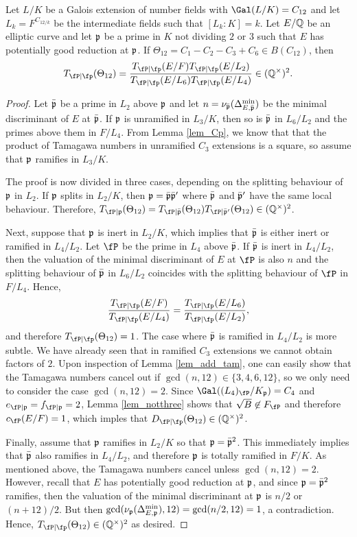 \begin{lemma}
    Let $L/K$ be a Galois extension of number fields with $\Gal(L/K)=C_{12}$ and let $L_k=F^{C_{12/k}}$ be the intermediate fields such that $[L_k:K]=k$. Let $E/\mathbb{Q}$ be an elliptic curve and let $\mathfrak{p}$ be a prime in $K$ not dividing $2$ or $3$ such that $E$ has potentially good reduction at $\mathfrak{p}$. If $\Theta_{12}=C_1-C_2-C_3+C_6\in B(C_{12})$, then $$\Tp(\Theta_{12})=\frac{\Tp(E/F)\Tp(E/L_2)}{\Tp(E/L_6)\Tp(E/L_4)}\in\QQss.$$
\end{lemma}
\begin{proof}
    Let $\bar{\mathfrak{p}}$ be a prime in $L_2$ above $\mathfrak{p}$ and let $n=\nu_{\bar{\mathfrak{p}}}(\Delta_{E,\bar{\mathfrak{p}}}^{\min})$ be the minimal discriminant of $E$ at $\bar{\mathfrak{p}}$. If $\mathfrak{p}$ is unramified in $L_3/K$, then so is $\bar{\mathfrak{p}}$ in $L_6/L_2$ and the primes above them in $F/L_4$. From Lemma \ref{lem_Cp}, we know that that the product of Tamagawa numbers in unramified $C_3$ extensions is a square, so assume that $\mathfrak{p}$ ramifies in $L_3/K$.

    The proof is now divided in three cases, depending on the splitting behaviour of $\mathfrak{p}$ in $L_2$. If $\mathfrak{p}$ splits in $L_2/K$, then $\mathfrak{p}=\bar{\mathfrak{p}}\bar{\mathfrak{p}}'$ where $\bar{\mathfrak{p}}$ and $\bar{\mathfrak{p}}'$ have the same local behaviour. Therefore, $T_{\fP\mid\pp}(\Theta_{12})=T_{\fP\mid\bar\pp}(\Theta_{12})T_{\fP\mid\bar\pp'}(\Theta_{12})\in\QQss$. 
    
    Next, suppose that $\mathfrak{p}$ is inert in $L_2/K$, which implies that $\bar{\mathfrak{p}}$ is either inert or ramified in $L_4/L_2$. Let $\fP$ be the prime in $L_4$ above $\bar{\mathfrak{p}}$. If $\bar{\mathfrak{p}}$ is inert in $L_4/L_2$, then the valuation of the minimal discriminant of $E$ at $\fP$ is also $n$ and the splitting behaviour of $\bar{\mathfrak{p}}$ in $L_6/L_2$ coincides with the splitting behaviour of $\fP$ in $F/L_4$. Hence, 
    $$\frac{\Tp(E/F)}{\Tp(E/L_4)}=\frac{\Tp(E/L_6)}{\Tp(E/L_2)},$$
    and therefore $\Tp(\Theta_{12})=1$. The case where $\bar{\mathfrak{p}}$ is ramified in $L_4/L_2$ is more subtle. We have already seen that in ramified $C_3$ extensions we cannot obtain factors of $2$. Upon inspection of Lemma \ref{lem_add_tam}, one can easily show that the Tamagawa numbers cancel out if $\gcd(n,12)\in\{3,4,6,12\}$, so we only need to consider the case $\gcd(n,12)=2$. Since $\Gal((L_4)_\fP/K_\pp)=C_4$ and $e_{\fP\mid\pp}=f_{\fP\mid\pp}=2$, Lemma \ref{lem_notthree} shows that $\sqrt{B}\not\in F_{\fP}$ and therefore $c_\fP(E/F)=1$, which imples that $\Dp(\Theta_{12})\in\QQss$.

    Finally, assume that $\mathfrak{p}$ ramifies in $L_2/K$ so that $\mathfrak{p}=\bar{\mathfrak{p}}^2$. This immediately implies that $\bar{\mathfrak{p}}$ also ramifies in $L_4/L_2$, and therefore $\mathfrak{p}$ is totally ramified in $F/K$. As mentioned above, the Tamagawa numbers cancel unless $\gcd(n,12)=2$. However, recall that $E$ has potentially good reduction at $\mathfrak{p}$, and since $\mathfrak{p}=\bar{\mathfrak{p}}^2$ ramifies, then the valuation of the minimal discriminant at $\mathfrak{p}$ is $n/2$ or $(n+12)/2$. But then $\gcd(\nu_{\mathfrak{p}}(\Delta_{E,\mathfrak{p}}^{\min}),12)=\gcd(n/2,12)=1$, a contradiction. Hence, $\Tp(\Theta_{12})\in\QQss$ as desired.
\end{proof}

